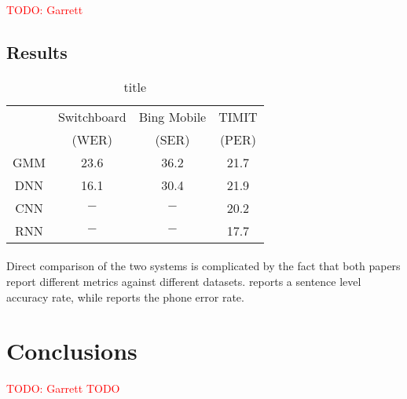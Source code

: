 \documentclass[letterpaper]{article}
\newcommand{\TODO}[1]{\textcolor{red}{TODO: #1}}
\begin{document}
\TODO{Garrett}

\subsection*{Results}

\begin{table}[H]
	\centering
	\begin{tabular}{c|c|c|c}
		& Switchboard & Bing Mobile & TIMIT \\
		& (WER) & (SER) & (PER) \\
		\hline
		GMM & 23.6 & 36.2 & 21.7 \\
		DNN & 16.1 & 30.4 & 21.9 \\
		CNN & $-$ & $-$ & 20.2 \\
		\hline
		RNN & $-$ & $-$ & 17.7
	\end{tabular}
	\caption{title}
	\label{tbl:results}
\end{table}

\paragraph{} Direct comparison of the two systems is complicated by the fact that both papers report different metrics against different datasets. \cite{DBLP:journals/taslp/DahlYDA12} reports a sentence level accuracy rate, while \cite{DBLP:journals/taslp/Abdel-HamidMJDPY14} reports the phone error rate.

\section*{Conclusions} \TODO{Garrett TODO}

\appendix

\singlespacing



\end{document}

